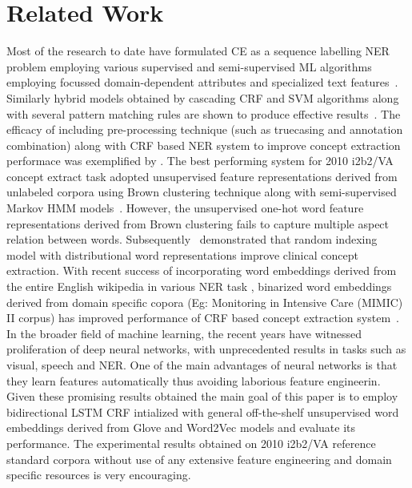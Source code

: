 \documentclass[11pt]{article}
\begin{document}
\section{Related Work}
\label{relatedworks}

Most of the research to date have formulated CE as a sequence labelling NER problem employing various supervised and semi-supervised ML algorithms employing focussed domain-dependent attributes and specialized text features~\cite{uzuner20112010}. Similarly hybrid models obtained by cascading CRF and SVM algorithms along with several pattern matching rules are shown to produce effective results~\cite{boagcliner}. The efficacy of including pre-processing technique (such as truecasing and annotation combination) along with CRF based NER system to improve concept extraction performace was exemplified by \cite{fu2014improving}. The best performing system for 2010 i2b2/VA concept extract task adopted unsupervised feature representations  derived from unlabeled corpora using Brown clustering technique along with semi-supervised Markov HMM models~\cite{de2011machine}. However, the unsupervised one-hot word feature representations derived from Brown clustering fails to capture multiple aspect relation between words. Subsequently~\cite{jonnalagadda2012enhancing} demonstrated that random indexing model with distributional word representations  improve clinical concept extraction. With recent success of incorporating word embeddings derived from the entire English wikipedia in various NER task \cite{collobert2011natural}, binarized word embeddings derived from domain specific copora (Eg: Monitoring in Intensive Care (MIMIC) II corpus)  has improved performance of CRF based concept extraction system~\cite{wu2015study}. In the broader field of machine learning, the recent years have witnessed proliferation of  deep neural networks, with unprecedented results in tasks such as visual, speech and NER. One of the main advantages of neural networks is that they learn features automatically thus avoiding laborious feature engineerin. Given these promising results obtained the main goal of this paper is to employ bidirectional LSTM CRF intialized with general off-the-shelf unsupervised word embeddings derived from Glove and Word2Vec models and evaluate its performance. The experimental results obtained on 2010 i2b2/VA reference standard corpora without use of any extensive feature engineering  and domain specific resources is very encouraging.



%
% 
\blfootnote{
    \hspace{-0.65cm}  %
   
    
    
}
\end{document}
